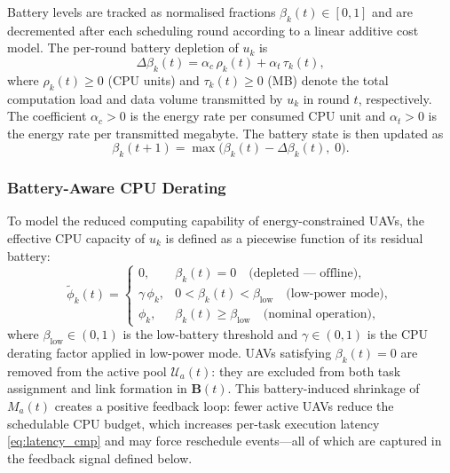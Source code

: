 Battery levels are tracked as normalised fractions
$\beta_k(t) \in [0, 1]$ and are decremented after each scheduling
round according to a linear additive cost model.
The per-round battery depletion of $u_k$ is
\begin{equation}
  \Delta\beta_k(t) =
    \alpha_c\,\rho_k(t) + \alpha_t\,\tau_k(t),
  \label{eq:energy_depletion}
\end{equation}
where $\rho_k(t) \geq 0$ (CPU units) and $\tau_k(t) \geq 0$ (MB)
denote the total computation load and data volume transmitted by
$u_k$ in round $t$, respectively.
The coefficient $\alpha_c > 0$ is the energy rate per consumed CPU
unit and $\alpha_t > 0$ is the energy rate per transmitted megabyte.
The battery state is then updated as
\begin{equation}
  \beta_k(t+1) = \max\!\bigl(\beta_k(t) - \Delta\beta_k(t),\; 0\bigr).
  \label{eq:battery_update}
\end{equation}

\subsubsection*{Battery-Aware CPU Derating}

To model the reduced computing capability of energy-constrained UAVs,
the effective CPU capacity of $u_k$ is defined as a piecewise function
of its residual battery:
\begin{equation}
  \tilde{\phi}_k(t) =
  \begin{cases}
    0,
      & \beta_k(t) = 0
        \quad\text{(depleted — offline)}, \\[4pt]
    \gamma\,\phi_k,
      & 0 < \beta_k(t) < \beta_{\mathrm{low}}
        \quad\text{(low-power mode)}, \\[4pt]
    \phi_k,
      & \beta_k(t) \geq \beta_{\mathrm{low}}
        \quad\text{(nominal operation)},
  \end{cases}
  \label{eq:cpu_derating}
\end{equation}
where $\beta_{\mathrm{low}} \in (0, 1)$ is the low-battery threshold
and $\gamma \in (0, 1)$ is the CPU derating factor applied in
low-power mode.
UAVs satisfying $\beta_k(t) = 0$ are removed from the active pool
$\mathcal{U}_a(t)$: they are excluded from both task assignment and
link formation in $\mathbf{B}(t)$.
This battery-induced shrinkage of $M_a(t)$ creates a positive
feedback loop: fewer active UAVs reduce the schedulable CPU budget,
which increases per-task execution latency \eqref{eq:latency_cmp}
and may force reschedule events—all of which are captured in the
feedback signal defined below.

